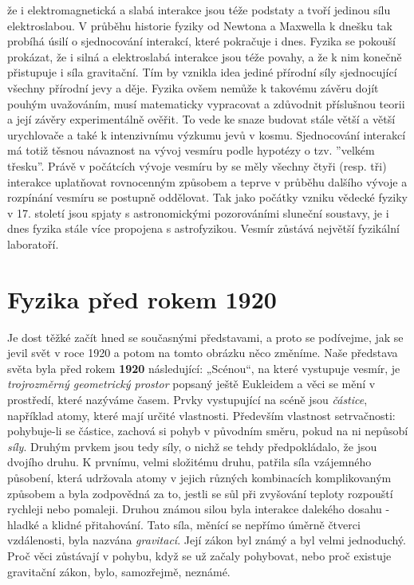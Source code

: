     že i elektromagnetická a slabá interakce jsou téže podstaty a tvoří jedinou sílu elektroslabou.
    V průběhu historie fyziky od Newtona a Maxwella k dnešku tak probíhá úsilí o sjednocování
    interakcí, které pokračuje i dnes. Fyzika se pokouší prokázat, že i silná a elektroslabá
    interakce jsou téže povahy, a že k nim konečně přistupuje i síla gravitační. Tím by vznikla idea
    jediné přírodní síly sjednocující všechny přírodní jevy a děje. Fyzika ovšem nemůže k takovému
    závěru dojít pouhým uvažováním, musí matematicky vypracovat a zdůvodnit příslušnou teorii a její
    závěry experimentálně ověřit. To vede ke snaze budovat stále větší a větší urychlovače a také k
    intenzivnímu výzkumu jevů v kosmu. Sjednocování interakcí má totiž těsnou návaznost na vývoj
    vesmíru podle hypotézy o tzv. ”velkém třesku”. Právě v počátcích vývoje vesmíru by se měly
    všechny čtyři (resp. tři) interakce uplatňovat rovnocenným způsobem a teprve v průběhu dalšího
    vývoje a rozpínání vesmíru se postupně oddělovat. Tak jako počátky vzniku vědecké fyziky v 17.
    století jsou spjaty s astronomickými pozorováními sluneční soustavy, je i dnes fyzika stále více
    propojena s astrofyzikou. Vesmír zůstává největší fyzikální laboratoří.
  
  \section{Fyzika před rokem 1920}\label{fyz:IchapIsecIV}
    Je dost těžké začít hned se současnými představami, a proto se podívejme, jak se jevil svět v 
    roce 1920 a potom na tomto obrázku něco změníme. Naše představa světa byla před rokem 
    \textbf{1920} následující: „Scénou“, na které vystupuje vesmír, je \emph{trojrozměrný 
    geometrický prostor} popsaný ještě Eukleidem a věci se mění v prostředí, které nazýváme časem. 
    Prvky vystupující na scéně jsou \emph{částice}, například atomy, které mají určité vlastnosti. 
    Především vlastnost setrvačnosti: pohybuje-li se částice, zachová si pohyb v původním směru, 
    pokud na ni nepůsobí \emph{síly}. Druhým prvkem jsou tedy síly, o nichž se tehdy  
    předpokládalo, že jsou dvojího druhu. K prvnímu, velmi složitému druhu, patřila síla vzájemného 
    působení, která udržovala atomy v jejich různých kombinacích komplikovaným způsobem a byla 
    zodpovědná za to, jestli se sůl při zvyšování teploty rozpouští rychleji nebo pomaleji. Druhou 
    známou silou byla interakce dalekého dosahu - hladké a klidné přitahování. Tato síla, měnící se 
    nepřímo úměrně čtverci vzdálenosti, byla nazvána \emph{gravitací}. Její zákon byl známý a byl 
    velmi jednoduchý. Proč věci zůstávají v pohybu, když se už začaly pohybovat, nebo proč existuje 
    gravitační zákon, bylo, samozřejmě, neznámé.
    
